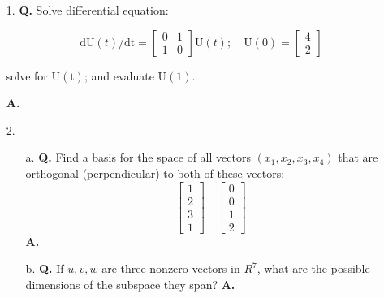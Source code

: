 \documentclass[main.tex]{subfiles}
\begin{document}
\begin{enumerate}
\item [1.] \textbf{Q.} Solve differential equation:

$$
\mathrm{dU}(t) / \mathrm{dt}=\left[\begin{array}{ll}
0 & 1 \\
1 & 0
\end{array}\right] \mathrm{U}(t) ; \quad \mathrm{U}(0)=\left[\begin{array}{l}
4 \\
2
\end{array}\right]
$$

solve for $\mathrm{U}(\mathrm{t})$; and evaluate $\mathrm{U}(1)$.

\textbf{A.}

\item[2.] 
    \begin{enumerate}
    \item [a.] \textbf{Q.} Find a basis for the space of all vectors $\left(x_{1}, x_{2}, x_{3}, x_{4}\right)$ that are orthogonal (perpendicular) to both of these vectors:
    $$
    \left[\begin{array}{l}
    1 \\
    2 \\
    3 \\
    1
    \end{array}\right] \quad\left[\begin{array}{l}
    0 \\
    0 \\
    1 \\
    2
    \end{array}\right]
    $$
    \textbf{A.}
    
    \item [b.] \textbf{Q.} If $u, v, w$ are three nonzero vectors in $R^{7}$, what are the possible dimensions of the subspace they span? \textbf{A.}

    \end{enumerate}


\end{enumerate}
\end{document}
